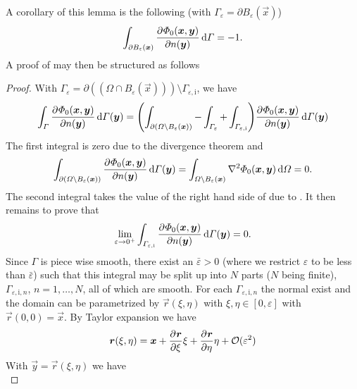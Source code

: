 \documentclass[b5paper, twoside, 11pt]{book}
\begin{document}
A corollary of this lemma is the following (with $\Gamma_\varepsilon = \partial B_\varepsilon(\vec{x})$)
\begin{equation*}
	\int_{\partial B_\varepsilon(\vec{x})}\pderiv{\Phi_0(\vec{x},\vec{y})}{n(\vec{y})}\idiff\Gamma = -1.
\end{equation*}
A proof of  may then be structured as follows
\begin{proof}
	With $\Gamma_\varepsilon = \partial((\Omega\cap B_\varepsilon(\vec{x})))\setminus\Gamma_{\varepsilon,\mathrm{i}}$, we have
	\begin{equation*}
		\int_\Gamma \pderiv{\Phi_0(\vec{x},\vec{y})}{n(\vec{y})}\idiff\Gamma(\vec{y}) = \left(\int_{\partial(\Omega\setminus B_\varepsilon(\vec{x}))}-\int_{\Gamma_\varepsilon}+\int_{\Gamma_{\varepsilon,\mathrm{i}}}\right) \pderiv{\Phi_0(\vec{x},\vec{y})}{n(\vec{y})}\idiff\Gamma(\vec{y})
	\end{equation*}
	The first integral is zero due to the divergence theorem and 
	\begin{equation*}
		\int_{\partial(\Omega\setminus B_\varepsilon(\vec{x}))} \pderiv{\Phi_0(\vec{x},\vec{y})}{n(\vec{y})}\idiff\Gamma(\vec{y}) = \int_{\Omega\setminus B_\varepsilon(\vec{x})} \nabla^2\Phi_0(\vec{x},\vec{y})\idiff\Omega = 0.
	\end{equation*}	
	 The second integral takes the value of the right hand side of  due to . It then remains to prove that
	 \begin{equation*}
	 	\lim_{\varepsilon\to 0^+}\int_{\Gamma_{\varepsilon,\mathrm{i}}} \pderiv{\Phi_0(\vec{x},\vec{y})}{n(\vec{y})}\idiff\Gamma(\vec{y}) = 0.
	 \end{equation*}
	 Since $\Gamma$ is piece wise smooth, there exist an $\bar{\varepsilon}>0$ (where we restrict $\varepsilon$ to be less than $\bar{\varepsilon}$) such that this integral may be split up into $N$ parts ($N$ being finite), $\Gamma_{\varepsilon,\mathrm{i},n}$, $n=1,\dots,N$, all of which are smooth. For each $\Gamma_{\varepsilon,\mathrm{i},n}$ the normal exist and the domain can be parametrized by $\vec{r}(\xi,\eta)$ with $\xi,\eta\in[0,\varepsilon]$ with $\vec{r}(0,0)=\vec{x}$. By Taylor expansion we have
	 \begin{equation*}
	 	\vec{r}(\xi,\eta) = \vec{x} + \pderiv{\vec{r}}{\xi}\xi+\pderiv{\vec{r}}{\eta}\eta+\bigoh(\varepsilon^2)
	 \end{equation*}
	 With $\vec{y} = \vec{r}(\xi,\eta)$ we have
	 \begin{equation*}

\end{equation*}
\end{proof}
\end{document}
